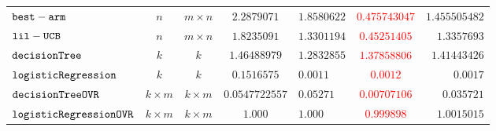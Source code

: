 {\begin {table}[H]
\begin{center}
{\begin{tabular}{|| >{\tiny}l || c | c || c || l | c | r ||  }
         \hhline{||-||--||-||---||}
         $\mathtt{best-arm}$~\cite{Jamieson2015TheAO} & $ n $ & $  m \times n $ & $ 2.2879071$   & $ 1.8580622$ & \textcolor{red}{$0.475743047$} & $ 1.455505482 $  \\
         \hhline{||-||--||-||---||}
         $\mathtt{lil-UCB}$~\cite{Jamieson2015TheAO} & $ n $ & $ m \times n $ & $1.8235091$   & $ 1.3301194$ & \textcolor{red}{$0.45251405$} & $ 1.3357693 $  \\
         \hhline{||-||--||-||---||}
         $\mathtt{decisionTree}$ & $k$ &  $k$ & $ 1.46488979 $  & $ 1.2832855 $ & $ \textcolor{red}{1.37858806} $ & {$1.41443426 $}  \\
         \hhline{||-||--||-||---||}
         $  \mathtt{logisticRegression}$ & $k$ &  $k$ & $ 0.1516575 $  &  $ 0.0011 $ & \textcolor{red}{$0.0012$} & {$0.0017$}   \\
        \hhline{||-||--||-||---||}
        $  \mathtt{decisionTreeOVR}$ & $k \times m$ &  $ k \times m $ &  $0.0547722557  $ & $0.05271$  &  \textcolor{red}{$0.00707106 $} & $0.035721$  \\
        \hhline{||-||--||-||---||}
        $  \mathtt{logisticRegressionOVR}$    & $k \times m$ &  $ k \times m $ &  $ 1.000  $  &  $ 1.000 $ & \textcolor{red}{$ 0.999898$} & $ 1.0015015 $ \\

\end{tabular}}
\end{center}
\end{table}}
